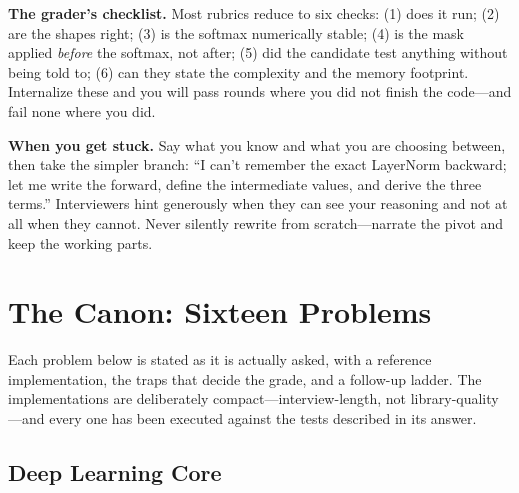 \begin{keyinsight}
\textbf{The grader's checklist.} Most rubrics reduce to six checks: (1) does it run; (2) are the shapes right; (3) is the softmax numerically stable; (4) is the mask applied \emph{before} the softmax, not after; (5) did the candidate test anything without being told to; (6) can they state the complexity and the memory footprint. Internalize these and you will pass rounds where you did not finish the code---and fail none where you did.
\end{keyinsight}

\textbf{When you get stuck.} Say what you know and what you are choosing between, then take the simpler branch: ``I can't remember the exact LayerNorm backward; let me write the forward, define the intermediate values, and derive the three terms.'' Interviewers hint generously when they can see your reasoning and not at all when they cannot. Never silently rewrite from scratch---narrate the pivot and keep the working parts.

\section{The Canon: Sixteen Problems}
\label{sec:coding_canon}

Each problem below is stated as it is actually asked, with a reference implementation, the traps that decide the grade, and a follow-up ladder. The implementations are deliberately compact---interview-length, not library-quality---and every one has been executed against the tests described in its answer.

\subsection{Deep Learning Core}

